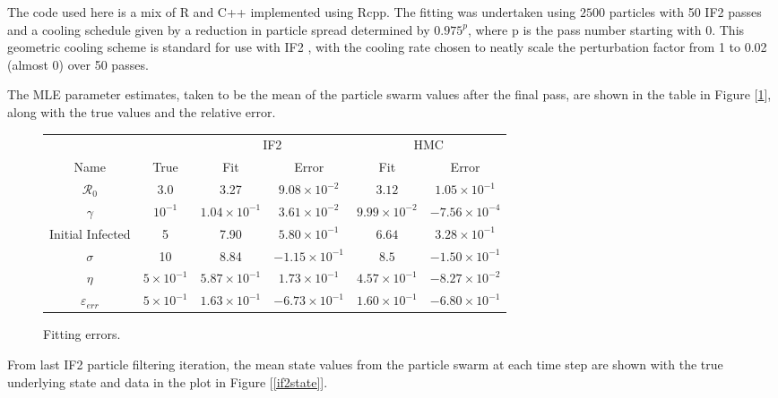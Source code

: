 	The code used here is a mix of R and C++ implemented using Rcpp. The fitting was undertaken using $2500$ particles with 50 IF2 passes and a cooling schedule given by a reduction in particle spread determined by $0.975^{p}$, where p is the pass number starting with 0. This geometric cooling scheme is standard for use with IF2 \cite{King2015a}\cite{King2016}, with the cooling rate chosen to neatly scale the perturbation factor from 1 to 0.02 (almost 0) over 50 passes.

	The MLE parameter estimates, taken to be the mean of the particle swarm values after the final pass, are shown in the table in Figure [\ref{fiterror}], along with the true values and the relative error.

	\begin{figure}
		\centering
		{\small
		\begin{tabular}{cccccc}
			& & \multicolumn{2}{c}{IF2} & \multicolumn{2}{c}{HMC} \\
			\cmidrule[1.0pt](r){3-4} \cmidrule[1.0pt](r){5-6}
			Name & True	& Fit & Error & Fit & Error \\
			\cmidrule[1.0pt](r){1-1} \cmidrule[1.0pt](r){2-2} \cmidrule[1.0pt](r){3-3} \cmidrule[1.0pt](r){4-4} \cmidrule[1.0pt](r){5-5} \cmidrule[1.0pt](r){6-6}
			$\mathcal{R}_0$ 		& 3.0 				 & 3.27 					& $9.08 \times 10^{-2}$ 	& $3.12$ 				& $1.05 \times 10^{-1}$		\\
			$\gamma$ 				& $10^{-1}$  		 & $1.04 \times 10^{-1}$ 	& $3.61 \times 10^{-2}$ 	& $9.99 \times 10^{-2}$ & $-7.56 \times 10^{-4}$	\\
			Initial Infected 	& 5  				 & 7.90 					& $5.80 \times 10^{-1}$ 	& $6.64$ 				& $3.28 \times 10^{-1}$ 	\\
			$\sigma$ 			& 10   				 & 8.84 					& $-1.15 \times 10^{-1}$ 	& $8.5$ 				& $-1.50 \times 10^{-1}$	\\
			$\eta$ 				& $5 \times 10^{-1}$ & $5.87 \times 10^{-1}$ 	& $1.73 \times 10^{-1}$ 	& $4.57 \times 10^{-1}$ & $-8.27 \times 10^{-2}$ 	\\
			$\varepsilon_{err}$ & $5 \times 10^{-1}$ & $1.63 \times 10^{-1}$ 	& $-6.73 \times 10^{-1}$ 	& $1.60 \times10^{-1}$  & $-6.80 \times 10^{-1}$
		\end{tabular}}
	    \caption{Fitting errors. \label{fiterror}}
    \end{figure}


	From last IF2 particle filtering iteration, the mean state values from the particle swarm at each time step are shown with the true underlying state and data in the plot in Figure [\ref{if2state}].


